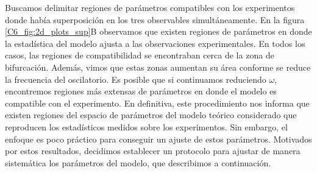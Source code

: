 \documentclass[./main.tex]{subfiles}
\begin{document}
Buscamos delimitar regiones de parámetros compatibles con los experimentos donde había superposición en los tres observables simultáneamente. En la figura \ref{C6_fig:2d_plots_sup}B observamos que existen regiones de parámetros en donde la estadística del modelo ajusta a las observaciones experimentales. En todos los casos, las regiones de compatibilidad se encontraban cerca de la zona de bifurcación. Además, vimos que estas zonas aumentan su área conforme se reduce la frecuencia del oscilatorio. Es posible que si continuamos reduciendo $\omega$, encontremos regiones más extensas de parámetros en donde el modelo es compatible con el experimento. En definitiva, este procedimiento nos informa que existen regiones del espacio de parámetros del modelo teórico considerado que reproducen los estadísticos medidos sobre los experimentos. Sin embargo, el enfoque es poco práctico para conseguir un ajuste de estos parámetros. Motivados por estos resultados, decidimos establecer un protocolo para ajustar de manera sistemática los parámetros del modelo, que describimos a continuación. 
\end{document}
